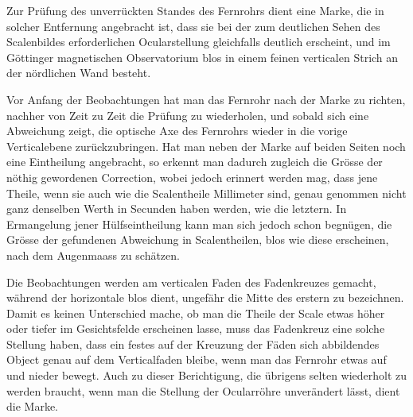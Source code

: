 Zur Prüfung des unverrückten Standes des Fernrohrs dient eine Marke, die in solcher Entfernung angebracht ist, dass sie bei der zum deutlichen Sehen des Scalenbildes erforderlichen Ocularstellung gleichfalls deutlich erscheint, und im Göttinger magnetischen Observatorium blos in einem feinen verticalen Strich an der nördlichen Wand besteht.\par{}

\par\clearpage
\endgroup
{}
Vor Anfang der Beobachtungen hat man das Fernrohr nach der Marke zu richten, nachher von Zeit zu Zeit die Prüfung zu wiederholen, und sobald sich eine Abweichung zeigt, die optische Axe des Fernrohrs wieder in die vorige Verticalebene zurückzubringen. Hat man neben der Marke auf beiden Seiten noch eine Eintheilung angebracht, so erkennt man dadurch zugleich die Grösse der nöthig gewordenen Correction, wobei jedoch erinnert werden mag, dass jene Theile, wenn sie auch wie die Scalentheile Millimeter sind, genau genommen nicht ganz denselben Werth in Secunden haben werden, wie die letztern. In Ermangelung jener Hülfseintheilung kann man sich jedoch schon begnügen, die Grösse der gefundenen Abweichung in Scalentheilen, blos wie diese erscheinen, nach dem Augenmaass zu schätzen.

Die Beobachtungen werden am verticalen Faden des Fadenkreuzes gemacht, während der horizontale blos dient, ungefähr die Mitte des erstern zu bezeichnen. Damit es keinen Unterschied mache, ob man die Theile der Scale etwas höher oder tiefer im Gesichtsfelde erscheinen lasse, muss das Fadenkreuz eine solche Stellung haben, dass ein festes auf der Kreuzung der Fäden sich abbildendes Object genau auf dem Verticalfaden bleibe, wenn man das Fernrohr etwas auf und nieder bewegt. Auch zu dieser Berichtigung, die übrigens selten wiederholt zu werden braucht, wenn man die Stellung der Ocularröhre unverändert lässt, dient die Marke.

